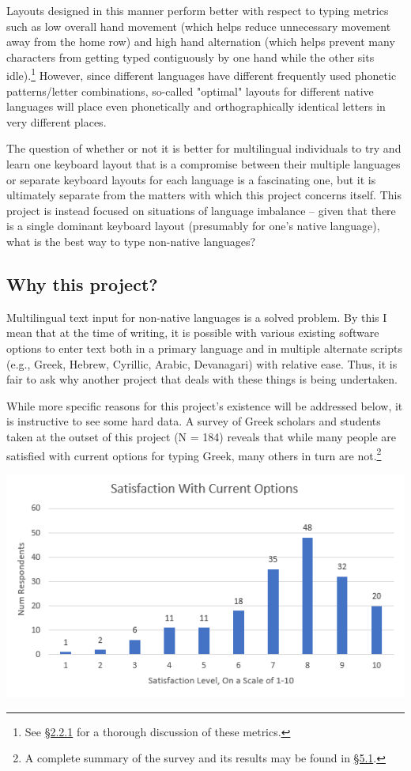 \documentclass[11pt]{article}
\begin{document}
Layouts designed in this manner perform better with respect to typing metrics such as low overall hand movement (which helps reduce unnecessary movement away from the home row) and high hand alternation (which helps prevent many characters from getting typed contiguously by one hand while the other sits idle).\footnote{See \hyperref[sec:org02f3267]{§2.2.1} for a thorough discussion of these metrics.} However, since different languages have different frequently used phonetic patterns/letter combinations, so-called "optimal" layouts for different native languages will place even phonetically and orthographically identical letters in very different places.

The question of whether or not it is better for multilingual individuals to try and learn one keyboard layout that is a compromise between their multiple languages or separate keyboard layouts for each language is a fascinating one, but it is ultimately separate from the matters with which this project concerns itself. This project is instead focused on situations of language imbalance -- given that there is a single dominant keyboard layout (presumably for one's native language), what is the best way to type non-native languages?

\subsection{Why this project?}
\label{sec:org58d5fba}

Multilingual text input for non-native languages is a solved problem. By this I mean that at the time of writing, it is possible with various existing software options to enter text both in a primary language and in multiple alternate scripts (e.g., Greek, Hebrew, Cyrillic, Arabic, Devanagari) with relative ease. Thus, it is fair to ask why another project that deals with these things is being undertaken.

While more specific reasons for this project's existence will be addressed below, it is instructive to see some hard data. A survey of Greek scholars and students taken at the outset of this project (N = 184) reveals that while many people are satisfied with current options for typing Greek, many others in turn are not.\footnote{A complete summary of the survey and its results may be found in \hyperref[sec:orgf2463e8]{§5.1}.}

\begin{center}
\includegraphics[width=.9\linewidth]{./images/satisfaction.PNG}
\end{center}
\end{document}
